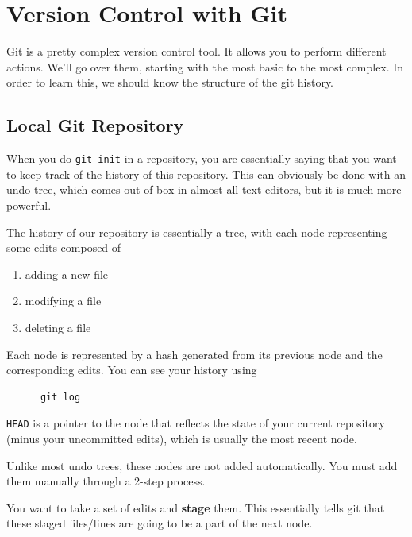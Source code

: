\section{Version Control with Git} 

  Git is a pretty complex version control tool. It allows you to perform different actions. We'll go over them, starting with the most basic to the most complex. In order to learn this, we should know the structure of the git history. 

\subsection{Local Git Repository} 

  When you do \texttt{git init} in a repository, you are essentially saying that you want to keep track of the history of this repository. This can obviously be done with an undo tree, which comes out-of-box in almost all text editors, but it is much more powerful. 

  \begin{definition}
    \label{def:local-git-tree}
    The history of our repository is essentially a tree, with each node representing some edits composed of 
    \begin{enumerate}
      \item adding a new file 
      \item modifying a file 
      \item deleting a file
    \end{enumerate} 
    Each node is represented by a hash generated from its previous node and the corresponding edits. You can see your history using  
    \begin{lstlisting}
      git log 
    \end{lstlisting} 
    \texttt{HEAD} is a pointer to the node that reflects the state of your current repository (minus your uncommitted edits), which is usually the most recent node. 
  \end{definition} 

  Unlike most undo trees, these nodes are not added automatically. You must add them manually through a 2-step process. 

  \begin{definition}[Stage]
    \label{def:stage}
    You want to take a set of edits and \textbf{stage} them. This essentially tells git that these staged files/lines are going to be a part of the next node. 
  \end{definition}

